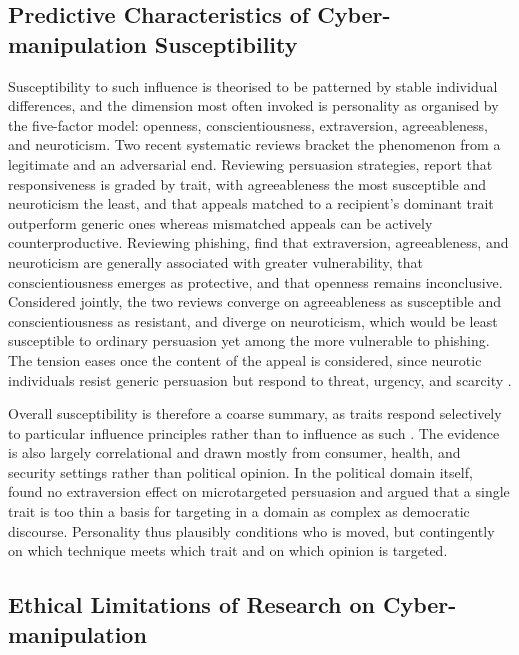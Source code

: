 \documentclass[11pt,a4paper]{article}
\begin{document}
\subsection{Predictive Characteristics of Cyber-manipulation Susceptibility}

Susceptibility to such influence is theorised to be patterned by stable individual
differences, and the dimension most often invoked is personality as organised by the
five-factor model: openness, conscientiousness, extraversion, agreeableness, and
neuroticism. Two recent systematic reviews bracket the phenomenon from a legitimate and an
adversarial end. Reviewing persuasion strategies, \citet{palmtims2025influence} report that
responsiveness is graded by trait, with agreeableness the most susceptible and neuroticism
the least, and that appeals matched to a recipient's dominant trait outperform generic ones
whereas mismatched appeals can be actively counterproductive. Reviewing phishing,
\citet{lopezaguilar2025phishing} find that extraversion, agreeableness, and neuroticism are
generally associated with greater vulnerability, that conscientiousness emerges as
protective, and that openness remains inconclusive. Considered jointly, the two reviews converge
on agreeableness as susceptible and conscientiousness as resistant, and diverge on
neuroticism, which would be least susceptible to ordinary persuasion yet among the more
vulnerable to phishing. The tension eases once the content of the appeal is considered,
since neurotic individuals resist generic persuasion but respond to threat, urgency, and
scarcity \citep{lopezaguilar2025phishing,palmtims2025influence}.

Overall susceptibility is therefore a coarse summary, as traits respond selectively to
particular influence principles rather than to influence as such
\citep{palmtims2025influence}. The evidence is also largely correlational and drawn mostly
from consumer, health, and security settings rather than political opinion. In the political
domain itself, \citet{decker2023personality} found no extraversion effect on microtargeted
persuasion and argued that a single trait is too thin a basis for targeting in a domain as
complex as democratic discourse. Personality thus plausibly conditions who is moved, but
contingently on which technique meets which trait and on which opinion is targeted.

\subsection{Ethical Limitations of Research on Cyber-manipulation}
\end{document}
